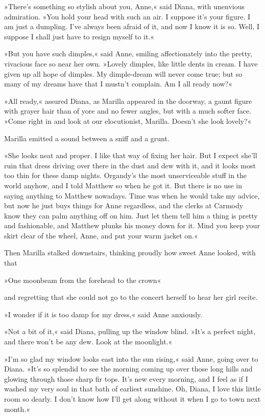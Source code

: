 »There’s something so stylish about you, Anne,« said Diana, with unenvious admiration. »You hold your head with such an air. I suppose it’s your figure. I am just a dumpling. I’ve always been afraid of it, and now I know it is so. Well, I suppose I shall just have to resign myself to it.«

»But you have such dimples,« said Anne, smiling affectionately into the pretty, vivacious face so near her own. »Lovely dimples, like little dents in cream. I have given up all hope of dimples. My dimple-dream will never come true; but so many of my dreams have that I mustn’t complain. Am I all ready now?«

»All ready,« assured Diana, as Marilla appeared in the doorway, a gaunt figure with grayer hair than of yore and no fewer angles, but with a much softer face. »Come right in and look at our elocutionist, Marilla. Doesn’t she look lovely?«

Marilla emitted a sound between a sniff and a grunt.

»She looks neat and proper. I like that way of fixing her hair. But I expect she’ll ruin that dress driving over there in the dust and dew with it, and it looks most too thin for these damp nights. Organdy’s the most unserviceable stuff in the world anyhow, and I told Matthew so when he got it. But there is no use in saying anything to Matthew nowadays. Time was when he would take my advice, but now he just buys things for Anne regardless, and the clerks at Carmody know they can palm anything off on him. Just let them tell him a thing is pretty and fashionable, and Matthew plunks his money down for it. Mind you keep your skirt clear of the wheel, Anne, and put your warm jacket on.«

Then Marilla stalked downstairs, thinking proudly how sweet Anne looked, with that

»One moonbeam from the forehead to the crown«

and regretting that she could not go to the concert herself to hear her girl recite.

»I wonder if it is too damp for my dress,« said Anne anxiously.

»Not a bit of it,« said Diana, pulling up the window blind. »It’s a perfect night, and there won’t be any dew. Look at the moonlight.«

»I’m so glad my window looks east into the sun rising,« said Anne, going over to Diana. »It’s so splendid to see the morning coming up over those long hills and glowing through those sharp fir tops. It’s new every morning, and I feel as if I washed my very soul in that bath of earliest sunshine. Oh, Diana, I love this little room so dearly. I don’t know how I’ll get along without it when I go to town next month.«

